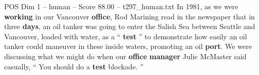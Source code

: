 \begin{textsample}{POS Dim 1 – human – Score 88.00 – t297\_human.txt}
In 1981, as we were \textbf{working} in our Vancouver \textbf{office}, Rod Marining read in the newspaper that in three \textbf{days}, an oil tanker was going to enter the Salish Sea between Seattle and Vancouver, loaded with water, as a “ \textbf{test} ” to demonstrate how easily an oil tanker could maneuver in these inside waters, promoting an oil \textbf{port}.
We were discussing what we might do when our \textbf{office} \textbf{manager} Julie McMaster said casually, “ You should do a \textbf{test} blockade. ”

\end{textsample}
